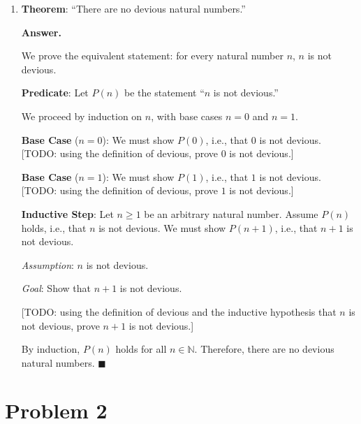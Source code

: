 \documentclass[11pt]{article}
\newcommand{\answer}{
    \vspace{0.5em}
    \noindent\textbf{Answer.}
}
\begin{document}
\begin{enumerate}[label=\textbf{(\alph*)}]
Therefore, $n = 25$ is a happy natural number between $10$ and $1000$ with no happy
proper divisors, which proves the theorem. $\blacksquare$

\item \textbf{Theorem}: ``There are no devious natural numbers.''

\answer

We prove the equivalent statement: for every natural number $n$, $n$ is not devious.

\textbf{Predicate}: Let $P(n)$ be the statement ``$n$ is not devious.''

We proceed by induction on $n$, with base cases $n = 0$ and $n = 1$.

\textbf{Base Case} ($n = 0$): We must show $P(0)$, i.e., that $0$ is not devious.
[TODO: using the definition of devious, prove $0$ is not devious.]

\textbf{Base Case} ($n = 1$): We must show $P(1)$, i.e., that $1$ is not devious.
[TODO: using the definition of devious, prove $1$ is not devious.]

\textbf{Inductive Step}: Let $n \geq 1$ be an arbitrary natural number. Assume $P(n)$
holds, i.e., that $n$ is not devious. We must show $P(n+1)$, i.e., that $n+1$ is not
devious.

\textit{Assumption}: $n$ is not devious.

\textit{Goal}: Show that $n + 1$ is not devious.

[TODO: using the definition of devious and the inductive hypothesis that $n$ is not
devious, prove $n+1$ is not devious.]

By induction, $P(n)$ holds for all $n \in \mathbb{N}$. Therefore, there are no devious
natural numbers. $\blacksquare$

\end{enumerate}

\section*{Problem 2}
\end{document}
